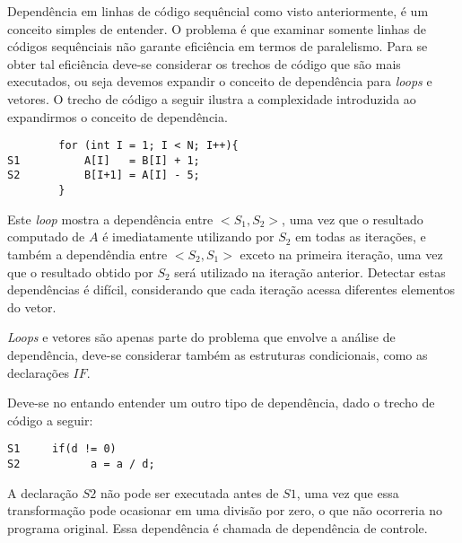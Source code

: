Dependência em linhas de código sequêncial como visto anteriormente, é um
conceito simples de entender.
O problema é que examinar somente linhas de códigos sequênciais não garante 
eficiência em termos de paralelismo. 
Para se obter tal eficiência deve-se considerar os trechos de
código que são mais executados, ou seja devemos expandir o conceito de
dependência para \textit{loops} e vetores.
O trecho de código a seguir ilustra a complexidade introduzida ao expandirmos o
conceito de dependência.

\begin{verbatim}
        for (int I = 1; I < N; I++){
S1          A[I]   = B[I] + 1;
S2          B[I+1] = A[I] - 5;
        }
\end{verbatim}

Este \textit{loop} mostra a dependência entre $<S_1,S_2>$, uma vez que o
resultado computado de $A$ é imediatamente utilizando por $S_2$ em todas as
iterações, e também a dependêndia entre $<S_2,S_1>$ exceto na primeira iteração,
uma vez que o resultado obtido por $S_2$ será utilizado na iteração anterior.
Detectar estas dependências é difícil, considerando que cada iteração acessa 
diferentes elementos do vetor.

\textit{Loops} e vetores são apenas parte do problema que envolve a análise de
dependência, deve-se considerar também as estruturas condicionais, como as
declarações $IF$.

Deve-se no entando entender um outro tipo de dependência, dado o trecho de
código a seguir:

\begin{verbatim}
S1     if(d != 0)
S2           a = a / d;
\end{verbatim}

A declaração $S2$ não pode ser executada antes de $S1$, uma vez que essa
transformação pode ocasionar em uma divisão por zero, o que não ocorreria no
programa original. Essa dependência é chamada de dependência de controle.




